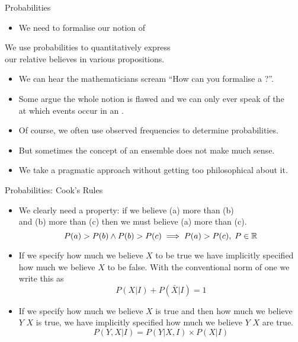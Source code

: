 \documentclass[mathserif, aspectratio=169]{beamer}
\begin{document}
\begin{frame}{Probabilities}
	\begin{itemize}
		\item We need to formalise our notion of 
	\end{itemize}
	\begin{cpage}\orange
		We use probabilities to quantitatively express\\
		our relative believes in various propositions.
	\end{cpage}
	\begin{itemize}
		\item We can hear the mathematicians scream ``How can you formalise a ?''.
		\item Some argue the whole notion is flawed and we can only ever speak of the \\
			at which events occur in an .
		\item Of course, we often use observed frequencies to determine probabilities.
		\item But sometimes the concept of an ensemble does not make much sense.
		\item We take a pragmatic approach without getting too philosophical about it.
	\end{itemize}
\end{frame}

\begin{frame}{Probabilities: Cook's Rules}
	\begin{itemize}
		\item We clearly need a  property: if we believe (a) more than (b)\\
			and (b) more than (c) then we must believe (a) more than (c).
			\[ P(a) > P(b) \land P(b) > P(c) \implies P(a) > P(c),\; P \in \mathbb{R} \]
		\item If we specify how much we believe $X$ to be true we have implicitly specified how much
			we believe $X$ to be false. With the conventional norm of one we write this as
			\[ P(X\vert I) + P(\bar{X}\vert I) = 1 \]
		\item If we specify how much we believe $X$ is true and then how much we believe\\
			$Y$  $X$ is true, we have implicitly specified how much we believe $Y$  $X$ are true.
			\[ P(Y, X\vert I) = P(Y\vert X, I) \times P(X\vert I) \]
	\end{itemize}
\end{frame}
\end{document}

